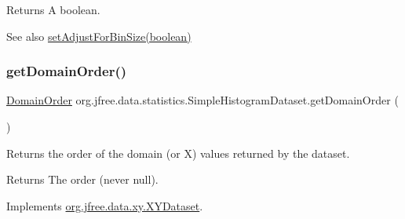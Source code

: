 \begin{DoxyReturn}{Returns}
A boolean.
\end{DoxyReturn}
\begin{DoxySeeAlso}{See also}
\mbox{\hyperlink{classorg_1_1jfree_1_1data_1_1statistics_1_1_simple_histogram_dataset_a8aa70f131654d3aa392cc0e90b89ed14}{set\+Adjust\+For\+Bin\+Size(boolean)}} 
\end{DoxySeeAlso}
\mbox{\label{classorg_1_1jfree_1_1data_1_1statistics_1_1_simple_histogram_dataset_a5f4f64559cabfd40b1879e5ab9402399}} 
\subsubsection{\texorpdfstring{get\+Domain\+Order()}{getDomainOrder()}}
{\footnotesize\ttfamily \mbox{\hyperlink{classorg_1_1jfree_1_1data_1_1_domain_order}{Domain\+Order}} org.\+jfree.\+data.\+statistics.\+Simple\+Histogram\+Dataset.\+get\+Domain\+Order (\begin{DoxyParamCaption}{ }\end{DoxyParamCaption})}

Returns the order of the domain (or X) values returned by the dataset.

\begin{DoxyReturn}{Returns}
The order (never {\ttfamily null}). 
\end{DoxyReturn}


Implements \mbox{\hyperlink{interfaceorg_1_1jfree_1_1data_1_1xy_1_1_x_y_dataset_a49306db52a1ea7de951d807d21ab9c7c}{org.\+jfree.\+data.\+xy.\+X\+Y\+Dataset}}.

\mbox{\label{classorg_1_1jfree_1_1data_1_1statistics_1_1_simple_histogram_dataset_ae3a25c80ccb7a3dcea94b57641734c52}} 
